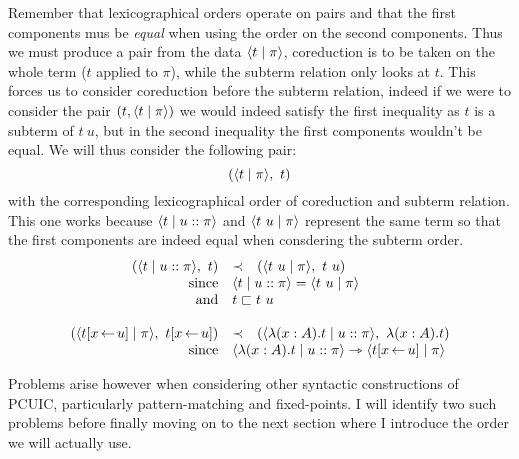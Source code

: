 Remember that lexicographical orders operate on pairs and that the first
components mus be \emph{equal} when using the order on the second components.
Thus we must produce a pair from the data \(\langle t \mid \pi \rangle\), coreduction is
to be taken on the whole term (\(t\) applied to \(\pi\)), while the subterm
relation only looks at \(t\).
This forces us to consider coreduction before the subterm relation, indeed if we
were to consider the pair \((t, \langle t \mid \pi \rangle)\) we would indeed satisfy
the first inequality as \(t\) is a subterm of \(t\ u\), but in the second
inequality the first components wouldn't be equal.
We will thus consider the following pair:
\[
  (\langle t \mid \pi \rangle,\ t)
\]
with the corresponding lexicographical order of coreduction and subterm
relation. This one works because \(\langle t \mid u :: \pi \rangle\) and
\(\langle t\ u \mid \pi \rangle\) represent the same term so that the first components
are indeed equal when consdering the subterm order.
\[
  \begin{array}{rcl}
    (\dpair{t \mid u :: \pi},\ t) &\prec& (\dpair{t\ u \mid \pi},\ t\ u) \\
    \text{since} &
    \multicolumn{2}{l}{\dpair{t \mid u :: \pi} = \dpair{t\ u \mid \pi}} \\
    \text{and} &
    \multicolumn{2}{l}{t \sqsubset t\ u} \\
    \\
    (\dpair{t[x \sto u] \mid \pi},\ t[x \sto u]) &\prec&
    (\dpair{\lambda (x:A).t \mid u :: \pi},\ \lambda (x:A).t) \\
    \text{since} &
    \multicolumn{2}{l}{
      \dpair{\lambda (x:A).t \mid u :: \pi} \red \dpair{t[x \sto u] \mid \pi}
    }
  \end{array}
\]

Problems arise however when considering other syntactic constructions of
\acrshort{PCUIC}, particularly pattern-matching and fixed-points.
I will identify two such problems before finally moving on to the next section
where I introduce the order we will actually use.

